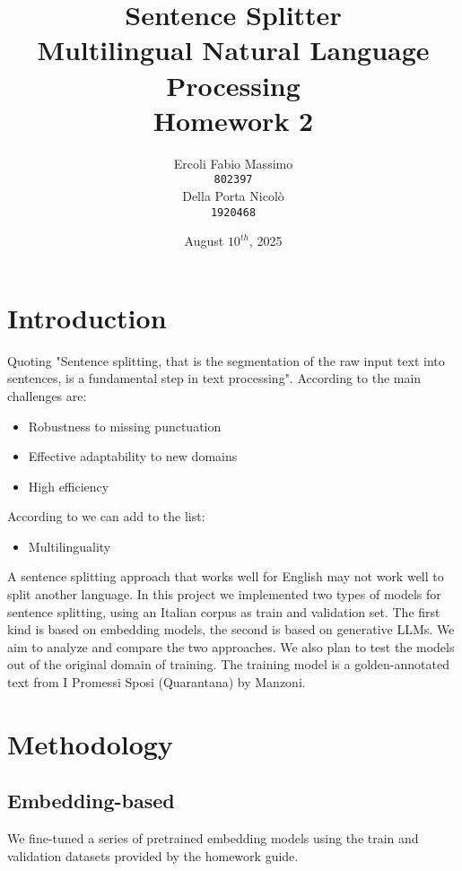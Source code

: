 \documentclass[11pt]{article}
\title{%
	Sentence Splitter\\
	\large Multilingual Natural Language Processing \\
	Homework 2}
\date{August $10^{th}$, 2025}
\author{Ercoli Fabio Massimo \\
\texttt{802397} \\\And
Della Porta Nicolò \\
\texttt{1920468} \\}
\begin{document}
\maketitle

\section{Introduction}

Quoting \cite{redaelli-sprugnoli-2024-sentence} "Sentence splitting, that is the segmentation of the raw input text into sentences, is a fundamental step in text processing".  According to \cite{frohmann2024segmenttextuniversalapproach} the main challenges are:

\begin{itemize}
	\item Robustness to missing punctuation
	\item Effective adaptability to new domains
	\item High efficiency
\end{itemize}

According to \cite{redaelli-sprugnoli-2024-sentence} we can add to the list:

\begin{itemize}
	\item Multilinguality
\end{itemize}
A sentence splitting approach that works well for English may not work well to split another language. \newline In this project we implemented two types of models for sentence splitting, using an Italian corpus as train and validation set.
The first kind is based on embedding models, the second is based on generative LLMs.
We aim to analyze and compare the two approaches. 
We also plan to test the models out of the original domain of training. 
The training model is a golden-annotated text from I Promessi Sposi (Quarantana) by Manzoni.

\section{Methodology}

\subsection{Embedding-based}

We fine-tuned a series of pretrained embedding models using the train and validation datasets provided by the homework guide.
\end{document}
